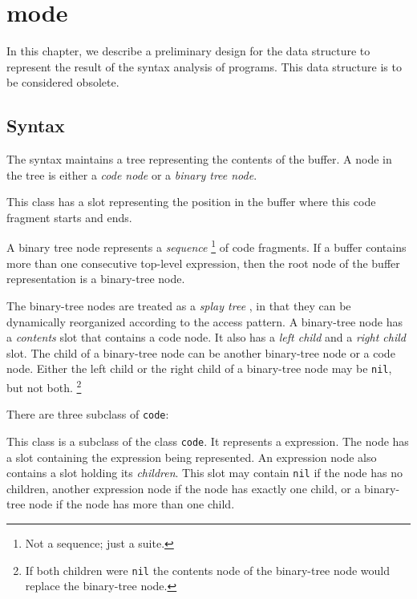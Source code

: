 \chapter{\commonlisp{} mode}
\label{chap-internals-common-lisp-mode}

In this chapter, we describe a preliminary design for the data
structure to represent the result of the syntax analysis of
\commonlisp{} programs.  This data structure is to be considered
obsolete.

\section{Syntax}

The \commonlisp{} syntax maintains a tree representing the contents of
the buffer.  A node in the tree is either a \emph{code node} or
a \emph{binary tree node}.


This class has a slot representing the position in the buffer where
this code fragment starts and ends.


A binary tree node represents a \emph{sequence}%
\footnote{Not a \commonlisp{} sequence; just a suite.}  of code
fragments.  If a buffer contains more than one consecutive top-level
expression, then the root node of the buffer representation is a
binary-tree node.

The binary-tree nodes are treated as a \emph{splay tree}
\cite{Sleator:1985:SBS:3828.3835}, in that they can be dynamically
reorganized according to the access pattern.  A binary-tree node has a
\emph{contents} slot that contains a code node.  It also has a
\emph{left child} and a \emph{right child} slot.  The child of a
binary-tree node can be another binary-tree node or a code node.
Either the left child or the right child of a binary-tree node may be
\texttt{nil}, but not both.%
\footnote{If both children were \texttt{nil} the contents node of the
  binary-tree node would replace the binary-tree node.}

There are three subclass of \texttt{code}:


This class is a subclass of the class \texttt{code}.  It represents a
\commonlisp{} expression.  The node has a slot containing the
expression being represented.  An expression node also
contains a slot holding its \emph{children}.  This slot may contain
\texttt{nil} if the node has no children, another expression node if
the node has exactly one child, or a binary-tree node if the node has
more than one child.

